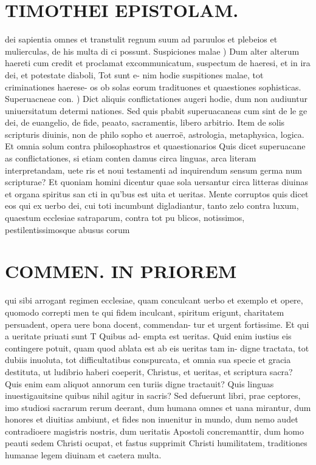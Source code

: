 \documentclass{article}
\begin{document}
\begin{pages}
\section*{TIMOTHEI EPISTOLAM. }
\marginpar{[ p.159 ]}\pstart dei sapientia omnes et transtulit regnum suum ad paruulos et plebeios et mulierculas, de his multa di ci possunt.  \pend\pstart Suspiciones malae ) Dum alter alterum haereti cum credit et proclamat excommunicatum, suspectum de haeresi, et in ira dei, et potestate diaboli, Tot sunt e- nim hodie suspitiones malae, tot criminationes haerese- os ob solas eorum tradituones et quaestiones sophisticas.  \pend\pstart Superuacneae con. ) Dict aliquis conflictationes augeri hodie, dum non audiuntur uniuersitatum determi nationes. Sed quis pbabit superuacaneas cum sint de le ge dei, de euangelio, de fide, peaato, sacramentis, libero arbitrio. Item de solis scripturis diuinis, non de philo sopho et auerroë, astrologia, metaphysica, logica. Et omnia solum contra philosophastros et quaestionarios Quis dicet superuacane as conflictationes, si etiam conten damus circa linguas, arca literam interpretandam, uete ris et noui testamenti ad inquirendum sensum germa num scripturae? Et quoniam homini dicentur quae sola uersantur circa litteras diuinas et organa spiritus san cti in qu'bus est uita et ueritas.  \pend\pstart Mente corruptos quis dicet eos qui ex uerbo dei, cui toti incumbunt digladiantur, tanto zelo contra luxum, quaestum ecclesiae satraparum, contra tot pu blicos, notissimos, pestilentissimosque abusus corum  \pend
\section*{COMMEN. IN PRIOREM }
\marginpar{[ p.160 ]}\pstart qui sibi arrogant regimen ecclesiae, quam conculcant uerbo et exemplo et opere, quomodo correpti men te qui fidem inculcant, spiritum erigunt, charitatem persuadent, opera uere bona docent, commendan- tur et urgent fortissime.  \pend\pstart Et qui a ueritate priuati sunt T Quibus ad- empta est ueritas. Quid enim iustius eis contingere potuit, quam quod ablata est ab eis ueritas tam in- digne tractata, tot dubiis inuoluta, tot difficultatibus conspurcata, et omnia sua specie et gracia destituta, ut ludibrio haberi coeperit, Christus, et ueritas, et scriptura sacra? Quis enim eam aliquot annorum cen turiis digne tractauit? Quis linguas inuestigauitsine quibus nihil agitur in sacris? Sed defuerunt libri, prae ceptores, imo studiosi sacrarum rerum deerant, dum humana omnes et uana mirantur, dum honores et diuitias ambiunt, et fides non inuenitur in mundo, dum nemo audet contradioere magistris nostris, dum ueritatis Apostoli concremanttir, dum homo peauti sedem Christi ocupat, et fastus supprimit Christi humilitatem, traditiones humanae legem diuinam et caetera multa.  \pend
{}
{}

\end{pages}
\end{document}
